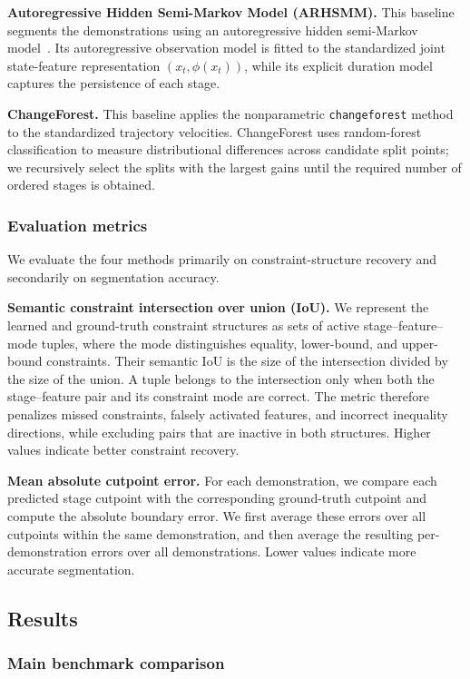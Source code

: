 \documentclass[lettersize,journal]{IEEEtran}
\begin{document}
\textbf{Autoregressive Hidden Semi-Markov Model (ARHSMM).}
This baseline segments the demonstrations using an autoregressive hidden semi-Markov model~\cite{johnson2013hsmm}. Its autoregressive observation model is fitted to the standardized joint state-feature representation $(x_t,\phi(x_t))$, while its explicit duration model captures the persistence of each stage.

\textbf{ChangeForest.}
This baseline applies the nonparametric \texttt{changeforest} method~\cite{londschien2023random} to the standardized trajectory velocities. ChangeForest uses random-forest classification to measure distributional differences across candidate split points; we recursively select the splits with the largest gains until the required number of ordered stages is obtained.

\subsubsection{Evaluation metrics}
We evaluate the four methods primarily on constraint-structure recovery and secondarily on segmentation accuracy.

\textbf{Semantic constraint intersection over union (IoU).}
We represent the learned and ground-truth constraint structures as sets of active stage--feature--mode tuples, where the mode distinguishes equality, lower-bound, and upper-bound constraints. Their semantic IoU is the size of the intersection divided by the size of the union. A tuple belongs to the intersection only when both the stage--feature pair and its constraint mode are correct. The metric therefore penalizes missed constraints, falsely activated features, and incorrect inequality directions, while excluding pairs that are inactive in both structures. Higher values indicate better constraint recovery.

\textbf{Mean absolute cutpoint error.}
For each demonstration, we compare each predicted stage cutpoint with the corresponding ground-truth cutpoint and compute the absolute boundary error. We first average these errors over all cutpoints within the same demonstration, and then average the resulting per-demonstration errors over all demonstrations. Lower values indicate more accurate segmentation.

\subsection{Results}
\subsubsection{Main benchmark comparison}
\label{sec:main_benchmark}
\end{document}
